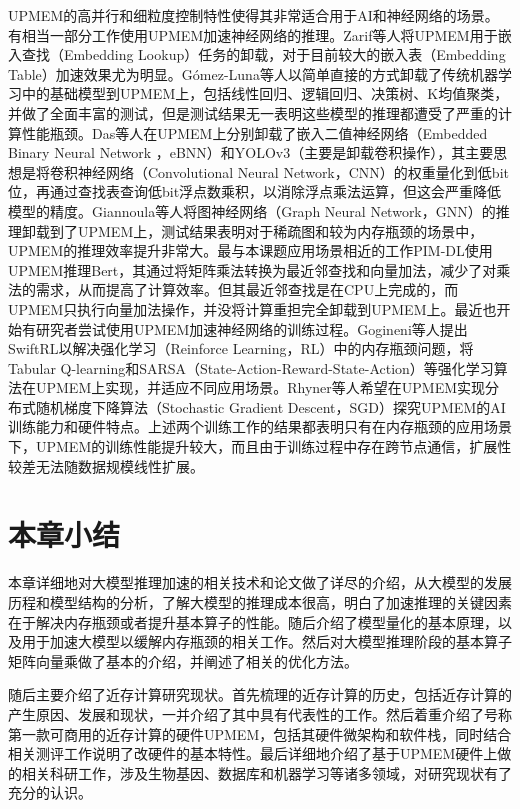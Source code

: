 UPMEM的高并行和细粒度控制特性使得其非常适合用于AI和神经网络的场景。有相当一部分工作使用UPMEM加速神经网络的推理。Zarif等人\cite{UPMEMEmbeddingLookups}将UPMEM用于嵌入查找（Embedding Lookup）任务的卸载，对于目前较大的嵌入表（Embedding Table）加速效果尤为明显。Gómez-Luna等人\cite{UPMEMTraditionalML}以简单直接的方式卸载了传统机器学习中的基础模型到UPMEM上，包括线性回归、逻辑回归、决策树、K均值聚类，并做了全面丰富的测试，但是测试结果无一表明这些模型的推理都遭受了严重的计算性能瓶颈。Das等人\cite{UPMEMCNN}在UPMEM上分别卸载了嵌入二值神经网络（Embedded Binary Neural Network ，eBNN）和YOLOv3（主要是卸载卷积操作），其主要思想是将卷积神经网络（Convolutional Neural Network，CNN）的权重量化到低bit位，再通过查找表查询低bit浮点数乘积，以消除浮点乘法运算，但这会严重降低模型的精度。Giannoula等人\cite{UPMEMGNN}将图神经网络（Graph Neural Network，GNN）的推理卸载到了UPMEM上，测试结果表明对于稀疏图和较为内存瓶颈的场景中，UPMEM的推理效率提升非常大。最与本课题应用场景相近的工作PIM-DL\cite{PIM-DL}使用UPMEM推理Bert，其通过将矩阵乘法转换为最近邻查找和向量加法，减少了对乘法的需求，从而提高了计算效率。但其最近邻查找是在CPU上完成的，而UPMEM只执行向量加法操作，并没将计算重担完全卸载到UPMEM上。最近也开始有研究者尝试使用UPMEM加速神经网络的训练过程。Gogineni等人\cite{SwiftRL}提出SwiftRL以解决强化学习（Reinforce Learning，RL）中的内存瓶颈问题，将Tabular Q-learning和SARSA（State-Action-Reward-State-Action）等强化学习算法在UPMEM上实现，并适应不同应用场景。Rhyner等人\cite{PIM-Opt}希望在UPMEM实现分布式随机梯度下降算法（Stochastic Gradient Descent，SGD）探究UPMEM的AI训练能力和硬件特点。上述两个训练工作的结果都表明只有在内存瓶颈的应用场景下，UPMEM的训练性能提升较大，而且由于训练过程中存在跨节点通信，扩展性较差无法随数据规模线性扩展。

\section{本章小结}
本章详细地对大模型推理加速的相关技术和论文做了详尽的介绍，从大模型的发展历程和模型结构的分析，了解大模型的推理成本很高，明白了加速推理的关键因素在于解决内存瓶颈或者提升基本算子的性能。随后介绍了模型量化的基本原理，以及用于加速大模型以缓解内存瓶颈的相关工作。然后对大模型推理阶段的基本算子矩阵向量乘做了基本的介绍，并阐述了相关的优化方法。

随后主要介绍了近存计算研究现状。首先梳理的近存计算的历史，包括近存计算的产生原因、发展和现状，一并介绍了其中具有代表性的工作。然后着重介绍了号称第一款可商用的近存计算的硬件UPMEM，包括其硬件微架构和软件栈，同时结合相关测评工作说明了改硬件的基本特性。最后详细地介绍了基于UPMEM硬件上做的相关科研工作，涉及生物基因、数据库和机器学习等诸多领域，对研究现状有了充分的认识。
